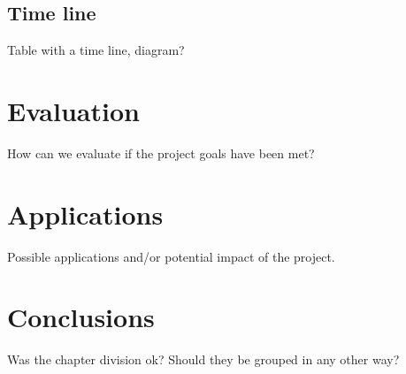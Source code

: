\documentclass[11pt]{report}
\begin{document}
\section{Time line}

Table with a time line, diagram?

\chapter{Evaluation}

How can we evaluate if the project goals have been met?

\chapter{Applications}

Possible applications and/or potential impact of the project.


\chapter{Conclusions}

Was the chapter division ok?
Should they be grouped in any other way?




\end{document}
